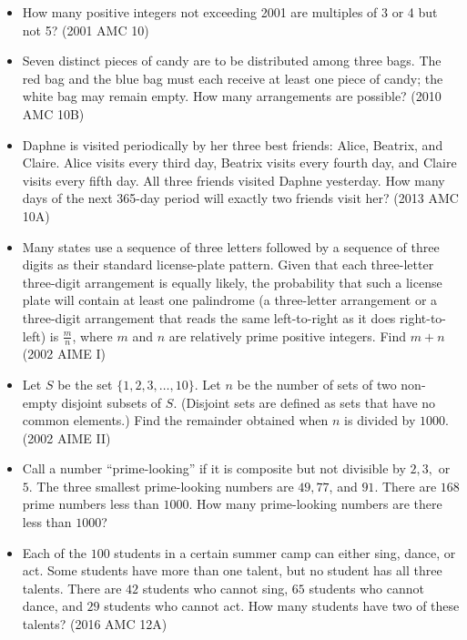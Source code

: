 \documentclass{article}
\begin{document}
\begin{itemize}

\item How many positive integers not exceeding 2001 are multiples of 3 or 4 but not 5? (2001 AMC 10)

\item Seven distinct pieces of candy are to be distributed among three bags. The red bag and the blue bag must each receive at least one piece of candy; the white bag may remain empty. How many arrangements are possible? (2010 AMC 10B)

\item Daphne is visited periodically by her three best friends: Alice, Beatrix, and Claire.  Alice visits every third day, Beatrix visits every fourth day, and Claire visits every fifth day.  All three friends visited Daphne yesterday.  How many days of the next 365-day period will exactly two friends visit her? (2013 AMC 10A)

\item Many states use a sequence of three letters followed by a sequence of three digits as their standard license-plate pattern. Given that each three-letter three-digit arrangement is equally likely,  the probability that such a license plate will contain at least one palindrome (a three-letter arrangement or a three-digit arrangement that reads the same left-to-right as it does right-to-left) is $\frac{m}{n}$, where $m$ and $n$ are relatively prime positive integers. Find $m+n$ (2002 AIME I)


\item Let $S$ be the set $\{1, 2, 3, \ldots, 10\}$. Let $n$ be the number of sets of two non-empty disjoint subsets of $S$. (Disjoint sets are defined as sets that have no common elements.) Find the remainder obtained when $n$ is divided by $1000$. (2002 AIME II)

\item Call a number ``prime-looking'' if it is composite but not divisible by $2, 3,$ or $5.$ The three smallest prime-looking numbers are $49, 77$, and $91$. There are $168$ prime numbers less than $1000$. How many prime-looking numbers are there less than $1000$?

\item Each of the $100$ students in a certain summer camp can either sing, dance, or act. Some students have more than one talent, but no student has all three talents. There are $42$ students who cannot sing, $65$ students who cannot dance, and $29$ students who cannot act. How many students have two of these talents? (2016 AMC 12A)



\end{itemize}
\end{document}
